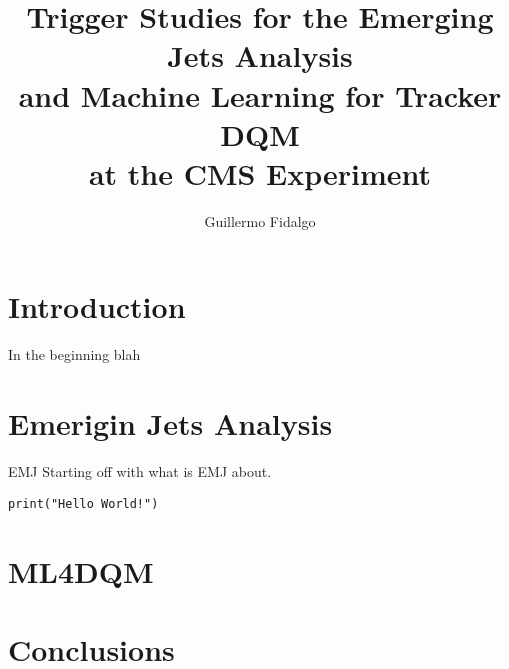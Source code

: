 \documentclass{beamer}
\title[EMJ and ML4TkDQM]{Trigger Studies for the Emerging Jets Analysis \\and Machine Learning for Tracker DQM \\at the CMS Experiment}
\author[GAFR]{Guillermo Fidalgo}
\institute[UPRM]{University of Puerto Rico - Mayagüez}
\begin{document}
\maketitle

\begin{frame}
\tableofcontents
\end{frame}

\section{Introduction}
\begin{frame}{In the beginning}
	blah
\end{frame}

\section{Emerigin Jets Analysis}

\begin{frame}[fragile]{EMJ}
	Starting off with what is EMJ about.
    
\begin{verbatim}
print("Hello World!")
\end{verbatim}
\end{frame}

\section{ML4DQM}


\section{Conclusions}
\end{document}
